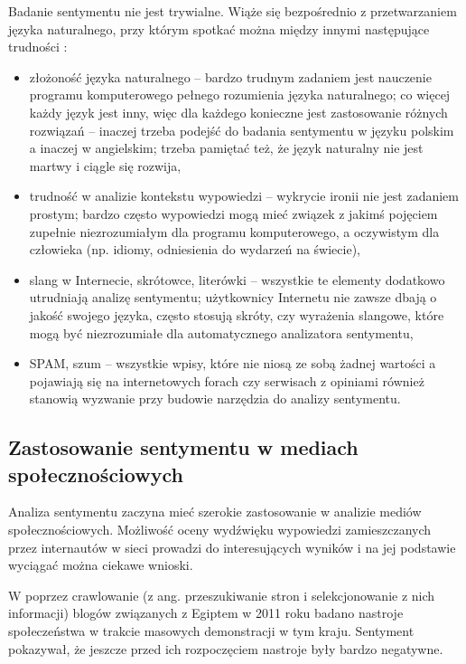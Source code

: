Badanie sentymentu nie jest trywialne. Wiąże się bezpośrednio z
przetwarzaniem języka naturalnego, przy którym spotkać można między innymi
następujące trudności \cite{ChallengeOfSpokenLanguage,
NaturalLanguageProcessingFuture}:

\begin{itemize}
  \item złożoność języka naturalnego -- bardzo trudnym zadaniem jest nauczenie 
  programu komputerowego pełnego rozumienia języka naturalnego; co więcej każdy
  język jest inny, więc dla każdego konieczne jest zastosowanie różnych
  rozwiązań -- inaczej trzeba podejść do badania sentymentu w języku polskim
  a inaczej w angielskim; trzeba pamiętać też, że język naturalny nie jest
  martwy i ciągle się rozwija,

  \item trudność w analizie kontekstu wypowiedzi -- wykrycie ironii nie jest
  zadaniem prostym; bardzo często wypowiedzi mogą mieć związek z jakimś pojęciem
  zupełnie niezrozumiałym dla programu komputerowego, a oczywistym dla człowieka
  (np. idiomy, odniesienia do wydarzeń na świecie),

  \item slang w Internecie, skrótowce, literówki -- wszystkie te elementy
  dodatkowo utrudniają analizę sentymentu; użytkownicy Internetu nie zawsze
  dbają o jakość swojego języka, często stosują skróty, czy wyrażenia slangowe,
  które mogą być niezrozumiałe dla automatycznego analizatora sentymentu,

  \item SPAM, szum -- wszystkie wpisy, które nie niosą ze sobą żadnej wartości
  a pojawiają się na internetowych forach czy serwisach z opiniami również
  stanowią wyzwanie przy budowie narzędzia do analizy sentymentu.

\end{itemize}





\subsection{Zastosowanie sentymentu w mediach społecznościowych}
Analiza sentymentu zaczyna mieć szerokie zastosowanie w analizie mediów
społecznościowych.
Możliwość oceny wydźwięku wypowiedzi zamieszczanych przez internautów w sieci
prowadzi do interesujących wyników i na jej podstawie wyciągać można ciekawe
wnioski. 

W \cite{AgileSentimentAnalysis} poprzez crawlowanie (z ang. przeszukiwanie stron
i selekcjonowanie z nich informacji) blogów związanych z Egiptem w 2011 roku
badano nastroje społeczeństwa w trakcie masowych demonstracji w tym kraju.
Sentyment pokazywał, że jeszcze przed ich rozpoczęciem nastroje były bardzo
negatywne.

